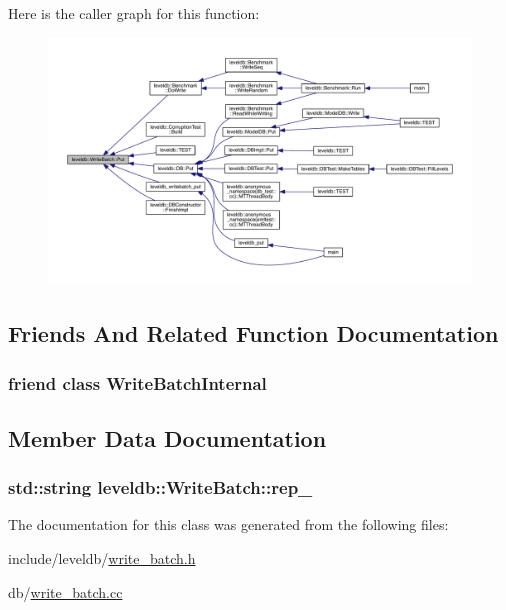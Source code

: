 Here is the caller graph for this function\+:
\nopagebreak
\begin{figure}[H]
\begin{center}
\leavevmode
\includegraphics[width=350pt]{classleveldb_1_1_write_batch_a30770379143a7ccb4ede18ddf0e45bf3_icgraph}
\end{center}
\end{figure}




\subsection{Friends And Related Function Documentation}
\hypertarget{classleveldb_1_1_write_batch_a0c491f15816190f8235ccd1367d5ae5f}{}
\subsubsection[{Write\+Batch\+Internal}]{\setlength{\rightskip}{0pt plus 5cm}friend class {\bf Write\+Batch\+Internal}\hspace{0.3cm}{\ttfamily [friend]}}\label{classleveldb_1_1_write_batch_a0c491f15816190f8235ccd1367d5ae5f}


\subsection{Member Data Documentation}
\hypertarget{classleveldb_1_1_write_batch_acb95a84f553a7dfa89f27a0500060837}{}
\subsubsection[{rep\+\_\+}]{\setlength{\rightskip}{0pt plus 5cm}std\+::string leveldb\+::\+Write\+Batch\+::rep\+\_\+\hspace{0.3cm}{\ttfamily [private]}}\label{classleveldb_1_1_write_batch_acb95a84f553a7dfa89f27a0500060837}


The documentation for this class was generated from the following files\+:\begin{DoxyCompactItemize}
\item 
include/leveldb/\hyperlink{write__batch_8h}{write\+\_\+batch.\+h}\item 
db/\hyperlink{write__batch_8cc}{write\+\_\+batch.\+cc}\end{DoxyCompactItemize}
